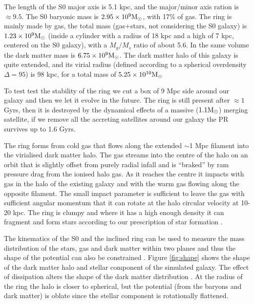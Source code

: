 \documentclass[preprint]{aastex}
\newcommand{\Msun}{{\rm M_\odot}}
\begin{document}
The length of the S0 major axis is 5.1 kpc, and the major/minor axis ration is 
$\approx 9.5$. The S0 baryonic mass is $2.95 \times 10^9
\Msun$, with 17\% of gas.
The ring is mainly made by gas, the total mass (gas+stars, not considering
the S0 galaxy) is $1.23\times 10^9 \Msun$ (inside a cylinder with a radius of
18 kpc and a high of 7 kpc, centered on the S0 galaxy), with a $M_g/M_s$ ratio of about 5.6.
In the same volume the dark matter mass is $6.75 \times 10^9 \Msun$.
The dark matter halo of this galaxy is quite extended, and its virial radius 
(defined according to a spherical overdensity $\Delta=95$) is 98 kpc, 
for a total mass of $5.25 \times 10^{10} \Msun$

To test test the stability of the ring we cut a box of 9 Mpc side around our
galaxy and then we let it evolve in the future. 
The ring is still present after $\approx 1$ Gyrs, 
then it is destroyed by the dynamical effects of a massive ($1.1 \Msun$)
merging satellite, if we remove all the accreting satellites around our
galaxy the PR survives up to 1.6 Gyrs.


The ring forms from cold gas that flows along the extended $\sim$1 Mpc filament into
the virialised dark matter halo. The gas streams into the centre of the halo on an
orbit that is slightly offset from purely radial infall and is ``braked'' by ram pressure
drag from the ionised halo gas. 
As it reaches the centre it
impacts with gas in the halo of the existing galaxy and with the
warm gas flowing along the opposite filament. The small impact parameter
is sufficient to leave the gas with sufficient angular momentum that it can
rotate at the halo circular velocity at 10-20 kpc. The ring is clumpy and 
where it has a high enough density it can fragment and form stars according to our
prescription of star formation \citep{katz92}.


The kinematics of the S0 and the inclined ring can be used to measure the
mass distribution of the stars, gas and dark matter within two planes and 
thus the shape of the potential can also be constrained
\citep{Schweizer1983,Reshetnikov,Arnaboldi94,Sackett94,Combes96,Iodice03}. 
Figure \ref{fig:shape} shows the shape of the dark matter halo and stellar component of the
simulated galaxy. The effect of dissipation alters the shape of the
dark matter distribution \citep{Dubinski1994,Kazantzidis2004}.
At the radius of the ring the halo is closer to spherical,
but the potential (from the baryons and dark matter) is oblate since the stellar
component is rotationally flattened.
\end{document}
